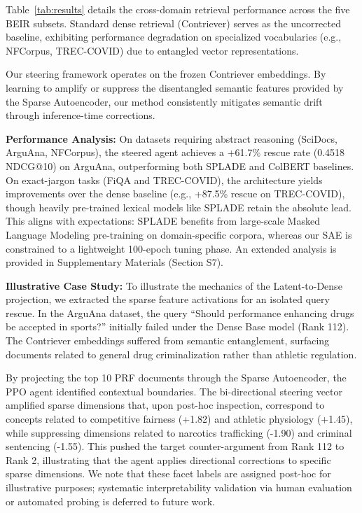 \documentclass[sigconf]{acmart}
\begin{document}
Table~\ref{tab:results} details the cross-domain retrieval performance across the five BEIR subsets. Standard dense retrieval (Contriever) serves as the uncorrected baseline, exhibiting performance degradation on specialized vocabularies (e.g., NFCorpus, TREC-COVID) due to entangled vector representations.

Our steering framework operates on the frozen Contriever embeddings. By learning to amplify or suppress the disentangled semantic features provided by the Sparse Autoencoder, our method consistently mitigates semantic drift through inference-time corrections.

\textbf{Performance Analysis:} On datasets requiring abstract reasoning (SciDocs, ArguAna, NFCorpus), the steered agent achieves a +61.7\% rescue rate (0.4518 NDCG@10) on ArguAna, outperforming both SPLADE and ColBERT baselines. On exact-jargon tasks (FiQA and TREC-COVID), the architecture yields improvements over the dense baseline (e.g., +87.5\% rescue on TREC-COVID), though heavily pre-trained lexical models like SPLADE retain the absolute lead. This aligns with expectations: SPLADE benefits from large-scale Masked Language Modeling pre-training on domain-specific corpora, whereas our SAE is constrained to a lightweight 100-epoch tuning phase. An extended analysis is provided in Supplementary Materials (Section S7).

\textbf{Illustrative Case Study:} To illustrate the mechanics of the Latent-to-Dense projection, we extracted the sparse feature activations for an isolated query rescue. In the ArguAna dataset, the query ``Should performance enhancing drugs be accepted in sports?'' initially failed under the Dense Base model (Rank 112). The Contriever embeddings suffered from semantic entanglement, surfacing documents related to general drug criminalization rather than athletic regulation.

By projecting the top 10 PRF documents through the Sparse Autoencoder, the PPO agent identified contextual boundaries. The bi-directional steering vector amplified sparse dimensions that, upon post-hoc inspection, correspond to concepts related to competitive fairness (+1.82) and athletic physiology (+1.45), while suppressing dimensions related to narcotics trafficking (-1.90) and criminal sentencing (-1.55). This pushed the target counter-argument from Rank 112 to Rank 2, illustrating that the agent applies directional corrections to specific sparse dimensions. We note that these facet labels are assigned post-hoc for illustrative purposes; systematic interpretability validation via human evaluation or automated probing is deferred to future work.
\end{document}
